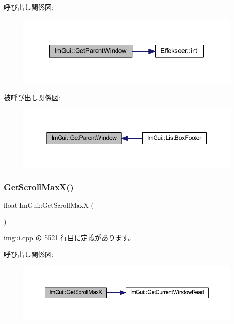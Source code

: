 呼び出し関係図\+:\nopagebreak
\begin{figure}[H]
\begin{center}
\leavevmode
\includegraphics[width=317pt]{namespace_im_gui_afd2f3d9a23ef5cb331d060a0d77e2cde_cgraph}
\end{center}
\end{figure}
被呼び出し関係図\+:\nopagebreak
\begin{figure}[H]
\begin{center}
\leavevmode
\includegraphics[width=350pt]{namespace_im_gui_afd2f3d9a23ef5cb331d060a0d77e2cde_icgraph}
\end{center}
\end{figure}
\mbox{\label{namespace_im_gui_af472cb090157c22e65a0aa1662b9f3d0}} 
\subsubsection{\texorpdfstring{Get\+Scroll\+Max\+X()}{GetScrollMaxX()}}
{\footnotesize\ttfamily float Im\+Gui\+::\+Get\+Scroll\+MaxX (\begin{DoxyParamCaption}{ }\end{DoxyParamCaption})}



 imgui.\+cpp の 5521 行目に定義があります。

呼び出し関係図\+:\nopagebreak
\begin{figure}[H]
\begin{center}
\leavevmode
\includegraphics[width=350pt]{namespace_im_gui_af472cb090157c22e65a0aa1662b9f3d0_cgraph}
\end{center}
\end{figure}
\mbox{\label{namespace_im_gui_ab34c0d5c63908a7ff50923151730f76a}} 
